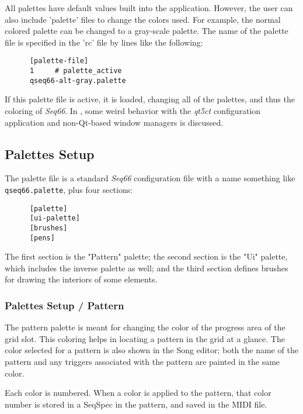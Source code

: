    All palettes have default values built into the application.  However, the
   user can also include 'palette' files to change the colors used.  For
   example, the normal colored palette can be changed to a gray-scale palette.
   The name of the palette file is specified in the 'rc' file by lines like the
   following:

   \begin{verbatim}
      [palette-file]
      1     # palette_active
      qseq66-alt-gray.palette
   \end{verbatim}

   If this palette file is active, it is loaded, changing all of the palettes,
   and thus the coloring of \textsl{Seq66}.
   In , some weird behavior with
   the \textsl{qt5ct} configuration application and non-Qt-based window managers
   is discussed.

\subsection{Palettes Setup}
\label{subsec:palettes_setup}

   The palette file is a standard \textsl{Seq66} configuration file with a name
   something like \texttt{qseq66.palette}, plus four sections:

   \begin{verbatim}
      [palette]
      [ui-palette]
      [brushes]
      [pens]
   \end{verbatim}

   The first section is the "Pattern" palette; the second section is the
   "Ui" palette, which includes the inverse palette as well; and the third
   section defines brushes for drawing the interiors of some elements.

\subsubsection{Palettes Setup / Pattern}
\label{subsubsec:palettes_setup_pattern}

   The pattern palette is meant for changing the color of the progress
   area of the grid slot.
   This coloring helps in locating a pattern in the grid at a glance.
   The color selected for a pattern is also shown in the Song editor;
   both the name of the pattern and any triggers associated with the pattern
   are painted in the same color.

   Each color is numbered. When a color is applied to the pattern,
   that color number is stored in a SeqSpec in the pattern, and saved
   in the MIDI file.

